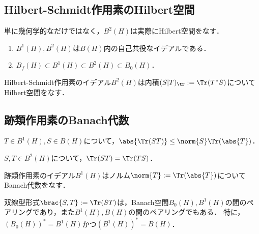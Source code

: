 \documentclass[uplatex,dvipdfmx]{jsreport}
\begin{document}
\subsection{Hilbert-Schmidt作用素のHilbert空間}

\begin{tcolorbox}[colframe=ForestGreen, colback=ForestGreen!10!white,breakable,colbacktitle=ForestGreen!40!white,coltitle=black,fonttitle=\bfseries\sffamily,
title=]
    単に幾何学的なだけではなく，$B^2(H)$は実際にHilbert空間をなす．
\end{tcolorbox}

\begin{proposition}\mbox{}
    \begin{enumerate}
        \item $B^1(H),B^2(H)$は$B(H)$内の自己共役なイデアルである．
        \item $B_f(H)\subset B^1(H)\subset B^2(H)\subset B_0(H)$．
    \end{enumerate}
\end{proposition}

\begin{theorem}
    Hilbert-Schmidt作用素のイデアル$B^2(H)$は内積$(S|T)_{\tr}:=\Tr(T^*S)$についてHilbert空間をなす．
\end{theorem}

\subsection{跡類作用素のBanach代数}

\begin{lemma}
    $T\in B^1(H),S\in B(H)$について，$\abs{\Tr(ST)}\le\norm{S}\Tr(\abs{T})$．
\end{lemma}

\begin{lemma}
    $S,T\in B^2(H)$について，$\Tr(ST)=\Tr(TS)$．
\end{lemma}

\begin{theorem}
    跡類作用素のイデアル$B^1(H)$はノルム$\norm{T}:=\Tr(\abs{T})$についてBanach代数をなす．
\end{theorem}

\begin{theorem}
    双線型形式$\brac{S,T}:=\Tr(ST)$は，Banach空間$B_0(H),B^1(H)$の間のペアリングであり，また$B^1(H),B(H)$の間のペアリングでもある．
    特に，$(B_0(H))^*=B^1(H)$かつ$(B^1(H))^*=B(H)$．
\end{theorem}
\end{document}
